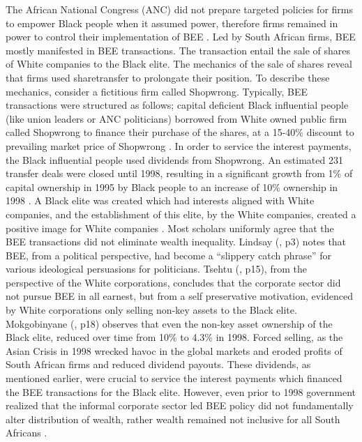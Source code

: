 The African National Congress (ANC) did not prepare targeted policies for firms to empower Black people when it assumed power, therefore firms remained in power to control their implementation of BEE \cite[p131]{N30}. Led by South African firms, BEE mostly manifested in BEE transactions. The transaction entail the sale of shares of White companies to the Black elite. The mechanics of the sale of shares reveal that firms used sharetransfer to prolongate their position. To describe these mechanics, consider a fictitious firm called Shopwrong. Typically, BEE transactions were structured as follows; capital deficient Black influential people (like union leaders or ANC politicians) borrowed from White owned public firm called Shopwrong to finance their purchase of the shares, at a 15-40\% discount to prevailing market price of Shopwrong \cite[p5]{N23}. In order to service the interest payments, the Black influential people used dividends from Shopwrong. An estimated 231 transfer deals were closed until 1998, resulting in a significant growth from 1\% of capital ownership in 1995 by Black people to an increase of 10\% ownership in 1998 \cite[p5-p6]{N23}. A Black elite was created which had interests aligned with White companies, and the establishment of this elite, by the White companies, created a positive image for White companies \cite[p86]{N27}. Most scholars uniformly agree that the BEE transactions did not eliminate wealth inequality. Lindsay (\citeyear{N30}, p3) notes that BEE, from a political perspective, had become a “slippery catch phrase” for various ideological persuasions for politicians. Tsehtu (\citeyear{N6}, p15), from the perspective of the White corporations, concludes that the corporate sector did not pursue BEE in all earnest, but from a self preservative motivation,  evidenced by White corporations only selling non-key assets to the Black elite. Mokgobinyane (\citeyear{N4}, p18) observes that even the non-key asset ownership of the Black elite, reduced over time from 10\% to 4.3\% in 1998. Forced selling, as the Asian Crisis in 1998 wrecked havoc in the global markets and eroded profits of South African firms and reduced dividend payouts. These dividends, as mentioned earlier, were crucial to service the interest payments which financed the BEE transactions for the Black elite. However, even prior to 1998 government realized that the informal corporate sector led BEE policy did not fundamentally alter distribution of wealth, rather wealth remained not inclusive for all South Africans \cite[p8]{N24}. 
